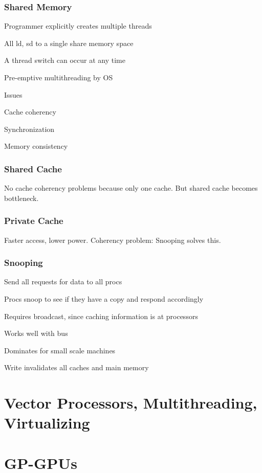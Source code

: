 \documentclass[a4paper, fontsize=8pt, landscape, DIV=1]{scrartcl}
\makeatletter
\renewenvironment{outline}[1][]{%
  \ifthenelse{\equal{#1}{}}{}{\renewcommand{\ol@type}{#1}}%
  \ol@z%
  \newcommand{\0}{\ol@toz\ol@z}%
  \newcommand{\1}{\vspace{\dimexpr\outlinespacingscalar\baselineskip-\baselineskip}\ol@toi\ol@i\item}%
  \newcommand{\2}{\vspace{\dimexpr\outlinespacingscalartwo\baselineskip-\baselineskip}\ol@toii\ol@ii\item}%
  \newcommand{\3}{\vspace{\dimexpr\outlinespacingscalar\baselineskip-\baselineskip}\ol@toiii\ol@iii\item}%
  \newcommand{\4}{\vspace{\dimexpr\outlinespacingscalar\baselineskip-\baselineskip}\ol@toiiii\ol@iiii\item}%
}{%
  \ol@toz\ol@exit%
}
\def\outlinespacingscalar{0.5}
\def\outlinespacingscalartwo{0.5}
\makeatother
\begin{document}
\begin{multicols*}{4}
  \subsubsection{Shared Memory}
  \begin{outline}
    \1 Programmer explicitly creates multiple threads
    \1 All ld, sd to a single share memory space
    \1 A thread switch can occur at any time
      \2 Pre-emptive multithreading by OS
    \1 Issues
      \2 Cache coherency
      \2 Synchronization
      \2 Memory consistency
  \end{outline}

  \subsubsection{Shared Cache}
  No cache coherency problems because only one cache. But shared cache becomes
  bottleneck.

  \subsubsection{Private Cache}
  Faster access, lower power. Coherency problem: Snooping solves this.

  \subsubsection{Snooping}
  \begin{outline}
    \1 Send all requests for data to all procs
    \1 Procs snoop to see if they have a copy and respond accordingly
    \1 Requires broadcast, since caching information is at processors
    \1 Works well with bus
    \1 Dominates for small scale machines
    \1 Write invalidates all caches and main memory
  \end{outline}

  \section{Vector Processors, Multithreading, Virtualizing}


  \section{GP-GPUs}



\end{multicols*}
\end{document}
